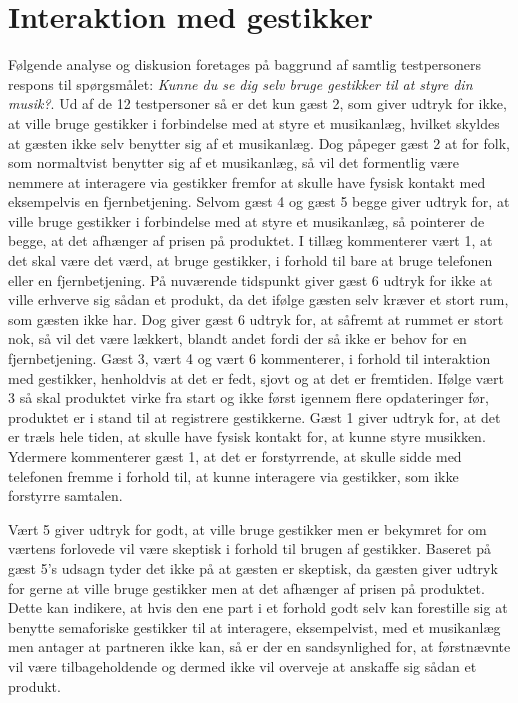 \section{Interaktion med gestikker}
\label{TestresultaterSocialAcceptBrug}
%
Følgende analyse og diskusion foretages på baggrund af samtlig testpersoners respons til spørgsmålet: \textit{Kunne du se dig selv bruge gestikker til at styre din musik?}. \blankline
%
Ud af de 12 testpersoner så er det kun gæst 2, som giver udtryk for ikke, at ville bruge gestikker i forbindelse med at styre et musikanlæg, hvilket skyldes at gæsten ikke selv benytter sig af et musikanlæg. Dog påpeger gæst 2 at for folk, som normaltvist benytter sig af et musikanlæg, så vil det formentlig være nemmere at interagere via gestikker fremfor at skulle have fysisk kontakt med eksempelvis en fjernbetjening. Selvom gæst 4 og gæst 5 begge giver udtryk for, at ville bruge gestikker i forbindelse med at styre et musikanlæg, så pointerer de begge, at det afhænger af prisen på produktet. I tillæg kommenterer vært 1, at det skal være det værd, at bruge gestikker, i forhold til bare at bruge telefonen eller en fjernbetjening. På nuværende tidspunkt giver gæst 6 udtryk for ikke at ville erhverve sig sådan et produkt, da det ifølge gæsten selv kræver et stort rum, som gæsten ikke har. Dog giver gæst 6 udtryk for, at såfremt at rummet er stort nok, så vil det være lækkert, blandt andet fordi der så ikke er behov for en fjernbetjening. Gæst 3, vært 4 og vært 6 kommenterer, i forhold til interaktion med gestikker, henholdvis at det er fedt, sjovt og at det er fremtiden. Ifølge vært 3 så skal produktet virke fra start og ikke først igennem flere opdateringer før, produktet er i stand til at registrere gestikkerne. Gæst 1 giver udtryk for, at det er træls hele tiden, at skulle have fysisk kontakt for, at kunne styre musikken. Ydermere kommenterer gæst 1, at det er forstyrrende, at skulle sidde med telefonen fremme i forhold til, at kunne interagere via gestikker, som ikke forstyrre samtalen.

Vært 5 giver udtryk for godt, at ville bruge gestikker men er bekymret for om værtens forlovede vil være skeptisk i forhold til brugen af gestikker. Baseret på gæst 5's udsagn tyder det ikke på at gæsten er skeptisk, da gæsten giver udtryk for gerne at ville bruge gestikker men at det afhænger af prisen på produktet. Dette kan indikere, at hvis den ene part i et forhold godt selv kan forestille sig at benytte semaforiske gestikker til at interagere, eksempelvist, med et musikanlæg men antager at partneren ikke kan, så er der en sandsynlighed for, at førstnævnte vil være tilbageholdende og dermed ikke vil overveje at anskaffe sig sådan et produkt.    

